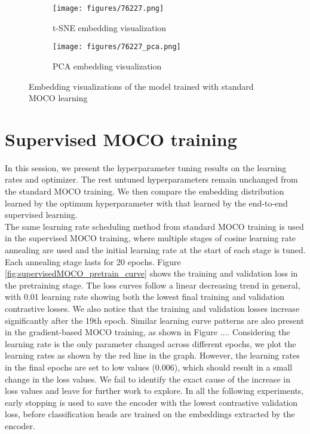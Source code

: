 \documentclass[12pt,twoside]{report}
\begin{document}
\begin{figure}
\centering
    \begin{subfigure}{.45\textwidth}
      \centering
      \texttt{[image: figures/76227.png]}
      \caption{t-SNE embedding visualization}
    \end{subfigure}%
    \begin{subfigure}{.45\textwidth}
      \centering
      \texttt{[image: figures/76227\_pca.png]}
      \caption{PCA embedding visualization}
    \end{subfigure}
    \caption{Embedding visualizations of the model trained with standard MOCO learning}
    \label{fig:moco_embedding}
\end{figure}



\section{Supervised MOCO training} \label{sec:supervisedMOCO_eval}
In this session, we present the hyperparameter tuning results on the learning rates and optimizer. The rest untuned hyperparameters remain unchanged from the standard MOCO training. We then compare the embedding distribution learned by the optimum hyperparameter with that learned by the end-to-end supervised learning.\\

The same learning rate scheduling method from standard MOCO training is used in the supervised MOCO training, where multiple stages of cosine learning rate annealing are used and the initial learning rate at the start of each stage is tuned. Each annealing stage lasts for 20 epochs. Figure \ref{fig:supervisedMOCO_pretrain_curve} shows the training and validation loss in the pretraining stage. The loss curves follow a linear decreasing trend in general, with 0.01 learning rate showing both the lowest final training and validation contrastive losses. We also notice that the training and validation losses increase significantly after the 19th epoch. Similar learning curve patterns are also present in the gradient-based MOCO training, as shown in Figure .... Considering the learning rate is the only parameter changed across different epochs, we plot the learning rates as shown by the red line in the graph. However, the learning rates in the final epochs are set to low values (0.006), which should result in a small change in the loss values. We fail to identify the exact cause of the increase in loss values and leave for further work to explore. 
In all the following experiments, early stopping is used to save the encoder with the lowest contrastive validation loss, before classification heads are trained on the embeddings extracted by the encoder. \\
\end{document}
